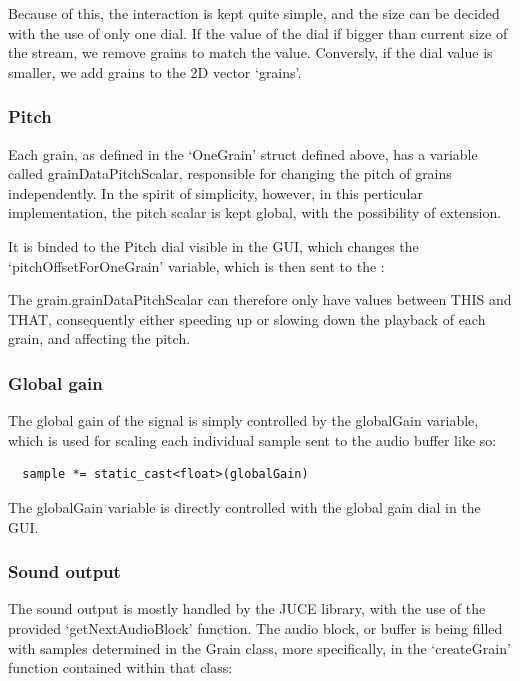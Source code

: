 Because of this, the interaction is kept quite simple, and the size
can be decided with the use of only one dial. If the value of the dial
if bigger than current size of the stream, we remove grains to match
the value. Conversly, if the dial value is smaller, we add grains to
the 2D vector `grains'.

\subsubsection{Pitch}
Each grain, as defined in the `OneGrain' struct defined above, has a
variable called grainDataPitchScalar, responsible for changing the
pitch of grains independently. In the spirit of simplicity, however,
in this perticular implementation, the pitch scalar is kept global,
with the possibility of extension.

It is binded to the Pitch dial visible in the GUI, which changes the
`pitchOffsetForOneGrain' variable, which is then sent to the :


The grain.grainDataPitchScalar can therefore only have values between
THIS and THAT, consequently either speeding up or slowing down the
playback of each grain, and affecting the pitch.

\subsubsection{Global gain}
The global gain of the signal is simply controlled by the globalGain
variable, which is used for scaling each individual sample sent to the
audio buffer like so:

\begin{lstlisting}
  sample *= static_cast<float>(globalGain)
\end{lstlisting}

The globalGain variable is directly controlled with the global gain
dial in the GUI.

\subsubsection{Sound output}

The sound output is mostly handled by the JUCE library, with the use
of the provided `getNextAudioBlock' function. The audio block, or
buffer is being filled with samples determined in the Grain class,
more specifically, in the `createGrain' function contained within that
class:

